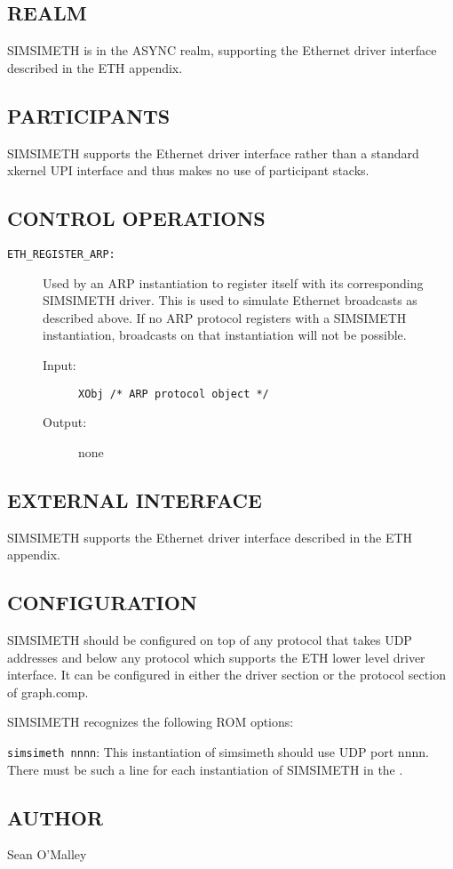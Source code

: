 \subsection*{REALM}

SIMSIMETH is in the ASYNC realm, supporting the Ethernet driver interface
described in the ETH appendix.


\subsection*{PARTICIPANTS}

SIMSIMETH supports the Ethernet driver interface rather than a standard
xkernel UPI interface and thus makes no use of participant stacks.


\subsection*{CONTROL OPERATIONS}

\begin{description}

\item[{\tt ETH\_REGISTER\_ARP:}]
Used by an ARP instantiation to register itself with its corresponding
SIMSIMETH driver.  This is used to simulate Ethernet broadcasts as
described above.  If no ARP protocol registers with a SIMSIMETH
instantiation, broadcasts on that instantiation will not be
possible. 
\begin{description}
\item[{\rm Input:}] {\tt XObj /* ARP protocol object */ }
\item[{\rm Output:}] none
\end{description}

\end{description}


\subsection*{EXTERNAL INTERFACE}

SIMSIMETH supports the Ethernet driver interface
described in the ETH appendix.


\subsection*{CONFIGURATION}

SIMSIMETH should be configured on top of any protocol that takes 
UDP addresses and below any protocol which supports the ETH 
lower level driver interface.  It can be configured in either the
driver section or the protocol section of graph.comp. 


\medskip

\noindent
SIMSIMETH recognizes the following ROM options:

\smallskip

{\tt simsimeth nnnn}:
This instantiation of simsimeth should use UDP port nnnn.  There must be
such a line for each instantiation of SIMSIMETH in the \xk{}.


\subsection*{AUTHOR}

\noindent Sean O'Malley


